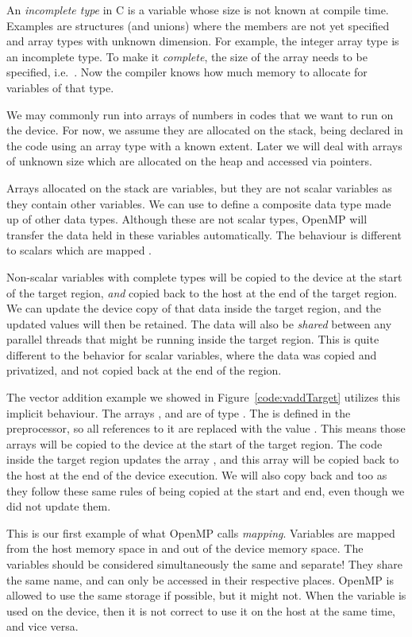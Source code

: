 An \emph{incomplete type} in C is a variable whose size is not known at compile time.
Examples are structures (and unions) where the members are not yet specified and array types with unknown dimension.
For example, the integer array type  is an incomplete type.
To make it \emph{complete}, the size of the array needs to be specified, i.e.\ .
Now the compiler knows how much memory to allocate for variables of that type.

We may commonly run into arrays of numbers in codes that we want to run on the device.
For now, we assume they are allocated on the stack, being declared in the code using an array type with a known extent.
Later we will deal with arrays of unknown size which are allocated on the heap and accessed via pointers.

Arrays allocated on the stack are variables, but they are not scalar variables as they contain other variables.
We can use  to define a composite data type made up of other data types.
Although these are not scalar types, OpenMP will transfer the data held in these variables automatically.
The behaviour is different to scalars which are mapped .

Non-scalar variables with complete types will be copied to the device at the start of the target region, \emph{and} copied back to the host at the end of the target region.
We can update the device copy of that data inside the target region, and the updated values will then be retained.
The data will also be \emph{shared} between any parallel threads that might be running inside the target region.
This is quite different to the behavior for scalar variables, where the data was copied and privatized, and not copied back at the end of the region.

The vector addition example we showed in Figure~\ref{code:vaddTarget} utilizes this implicit behaviour.
The arrays ,  and  are of type .
The  is defined in the preprocessor, so all references to it are replaced with the value .
This means those arrays will be copied to the device at the start of the target region.
The code inside the target region updates the array , and this array will be copied back to the host at the end of the device execution.
We will also copy back  and  too as they follow these same rules of being copied at the start and end, even though we did not update them.

This is our first example of what OpenMP calls \emph{mapping}.
Variables are mapped from the host memory space in and out of the device memory space.
The variables should be considered simultaneously the same and separate!
They share the same name, and can only be accessed in their respective places.
OpenMP is allowed to use the same storage if possible, but it might not.
When the variable is used on the device, then it is not correct to use it on the host at the same time, and vice versa.

